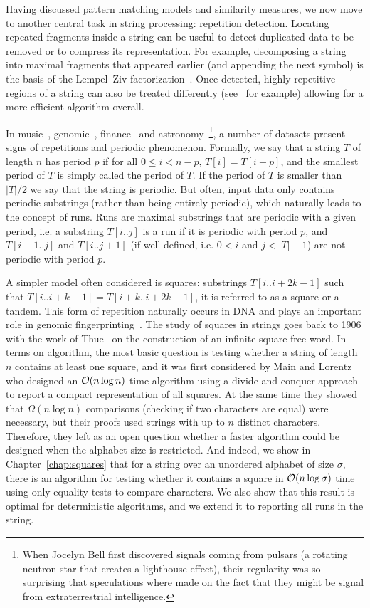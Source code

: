 Having discussed pattern matching models and similarity measures, we now move to another central task in string processing: repetition detection. Locating repeated fragments inside a string can be useful to detect duplicated data to be removed or to compress its representation. For example, decomposing a string into maximal fragments that appeared earlier (and appending the next symbol) is the basis of the Lempel--Ziv factorization~\cite{ziv1977universal}. Once detected, highly repetitive regions of a string can also be treated differently (see~\cite{Porat:09} for example) allowing for a more efficient algorithm overall.

In music~\cite{arom1989time}, genomic~\cite{pich2018somatic}, finance~\cite{harvey2007trends} and astronomy~\cite{hewish1979observation}\footnote{ When Jocelyn Bell first discovered signals coming from pulsars (a rotating neutron star that creates a lighthouse effect), their regularity was so surprising that speculations where made on the fact that they might be signal from extraterrestrial intelligence.}, a number of datasets present signs of repetitions and periodic phenomenon.
Formally, we say that a string $T$ of length $n$ has period $p$ if for all $0 \leq i < n - p$, $T[i]=T[i+p]$, and the smallest period of $T$ is simply called the period of $T$. If the period of $T$ is smaller than $|T|/2$ we say that the string is periodic.
%
But often, input data only contains periodic substrings (rather than being entirely periodic), which naturally leads to the concept of runs. Runs are maximal substrings that are periodic with a given period, i.e. a substring $T[i..j]$ is a run if it is periodic with period $p$, and $T[i-1..j]$ and $T[i..j+1]$ (if well-defined, i.e. $0<i$ and $j<|T|-1$) are not periodic with period $p$. 

A simpler model often considered is squares: substrings $T[i..i+2k-1]$ such that $T[i..i+k-1]=T[i+k..i+2k-1]$, it is referred to as a square or a tandem. This form of repetition naturally occurs in DNA and plays an important role in genomic fingerprinting~\cite{Kolpakov2003,GYMREK20179}. 
%
The study of squares in strings goes back to 1906 with the work of Thue~\cite{thue1906} on the construction of an infinite square free word. In terms on algorithm, the most basic question is testing whether a string of length $n$ contains at least one square, and it was first considered by Main and Lorentz~\cite{Main1984} who designed an $\mathcal{O}(n \log n)$ time algorithm using a divide and conquer approach to report a compact representation of all squares. At the same time they showed that $\Omega(n\log n)$ comparisons (checking if two characters are equal) were necessary, but their proofs used strings with up to $n$ distinct characters. Therefore, they left as an open question whether a faster algorithm could be designed when the alphabet size is restricted.  
And indeed, we show in Chapter~\ref{chap:squares} that for a string over an unordered alphabet of size $\sigma$, there is an algorithm for testing whether it contains a square in $\mathcal{O}(n\log \sigma)$ time using only equality tests to compare characters. We also show that this result is optimal for deterministic algorithms, and we extend it to reporting all runs in the string.

